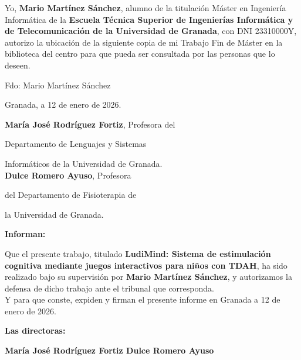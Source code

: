 \documentclass[10pt]{article}
\begin{document}
\newpage
\thispagestyle{empty}
\null
\newpage

Yo, \textbf{Mario Martínez Sánchez}, alumno de la titulación Máster en Ingeniería Informática de la \textbf{Escuela Técnica Superior de  Ingenierías  Informática y de Telecomunicación de la Universidad de Granada}, con DNI 23310000Y, autorizo la ubicación de la siguiente copia de mi Trabajo Fin de Máster en la biblioteca del centro para que pueda ser consultada por las personas que lo deseen.

\vspace{4cm}

Fdo: Mario Martínez Sánchez

\vspace{2cm}

\begin{flushright}
    Granada, a 12 de enero de 2026.
\end{flushright}
\newpage

\newpage
\thispagestyle{empty}
\null
\newpage

\textbf{María José Rodríguez Fortiz}, Profesora del

Departamento de Lenguajes y Sistemas 

Informáticos de la Universidad de Granada.
\\

\textbf{Dulce Romero Ayuso}, Profesora 

del Departamento de Fisioterapia de 

la Universidad de Granada.

\vspace{2cm}

\textbf{Informan:}

\vspace{1cm}

Que el presente trabajo, titulado \textbf{LudiMind: Sistema de estimulación cognitiva mediante juegos interactivos para niños con TDAH}, ha sido realizado bajo su supervisión por \textbf{Mario Martínez Sánchez}, y autorizamos la defensa de dicho trabajo ante el tribunal que corresponda.
\\

Y para que conste, expiden y firman el presente informe en Granada a 12 de enero de 2026.

\vspace{2cm}
\textbf{Las directoras:}

\vspace{4cm}
\begin{center}
    \textbf{María José Rodríguez Fortiz \hspace{2cm}
    Dulce Romero Ayuso}
\end{center}
\end{document}
